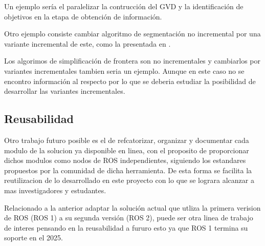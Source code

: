 Un ejemplo sería el paralelizar la contrucción del GVD y la identificación de
objetivos en la etapa de obtención de información.

Otro ejemplo consiste cambiar algoritmo de segmentación no incremental por una variante
incremental de este, como la presentada en \cite{Liu2015}. 

Los algorimos de simplificación de frontera son no incrementales y cambiarlos
por variantes incrementales tambien seria un ejemplo. Aunque en este caso no se
encontro información al respecto por lo que se deberia estudiar la posibilidad
de desarrollar las variantes incrementales.



\subsection{Reusabilidad}

Otro trabajo futuro posible es el de refcatorizar, organizar y documentar cada
modulo de la solucion ya disponible en linea, con el proposito de proporcionar
dichos modulos como nodos de ROS independientes, siguiendo los estandares
propuestos por la comunidad de dicha herramienta. De esta forma se facilita la
reutilizacion de lo desarrollado en este proyecto con lo que se lograra
alcanzar a mas investigadores y estudantes.

Relacionado a la anterior adaptar la solución actual que utliza la primera
verision de ROS (ROS 1) a su segunda versión (ROS 2), puede ser otra linea de
trabajo de interes pensando en la reusabilidad a fururo esto ya que ROS 1
termina su soporte en el 2025.




